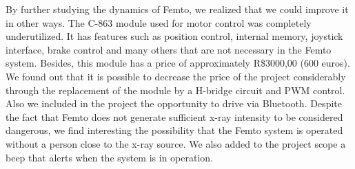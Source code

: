 \documentclass[journal]{IEEEtran}
\begin{document}

By further studying the dynamics of Femto, we realized that we could improve it in other ways. The C-863 module used for motor control was completely underutilized. It has features such as position control, internal memory, joystick interface, brake control and many others that are not necessary in the Femto system. Besides, this module has a price of approximately R\$3000,00 (600 euros). We found out that it is possible to decrease the price of the project considerably through the replacement of the module by a H-bridge circuit and PWM control. 
Also we included in the project the opportunity to drive via Bluetooth. Despite the fact that Femto does not generate sufficient x-ray intensity to be considered dangerous, we find interesting the possibility that the Femto system is operated without a person close to the x-ray source. We also added to the project scope a beep that alerts when the system is in operation.


\end{document}
